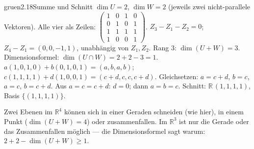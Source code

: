 \begin{loesungkarte}{gruen}{2.18}{Summe und Schnitt}
$\dim U = 2$, $\dim W = 2$ (jeweils zwei nicht-parallele Vektoren). Alle vier als Zeilen:
$\begin{pmatrix}1 & 0 & 1 & 0\\ 0 & 1 & 0 & 1\\ 1 & 1 & 1 & 1\\ 1 & 0 & 0 & 1\end{pmatrix}$. $Z_3 - Z_1 - Z_2 = 0$; $Z_4 - Z_1 = (0, 0, -1, 1)$, unabhängig von $Z_1, Z_2$. Rang $3$: $\dim(U + W) = 3$. Dimensionsformel: $\dim(U\cap W) = 2 + 2 - 3 = 1$.
$a(1, 0, 1, 0) + b(0, 1, 0, 1) = (a, b, a, b)$; $c(1, 1, 1, 1) + d(1, 0, 0, 1) = (c + d, c, c, c + d)$. Gleichsetzen: $a = c + d$, $b = c$, $a = c$, $b = c + d$. Aus $a = c = c + d$: $d = 0$; dann $a = b = c$. Schnitt: $\mathbb R\,(1, 1, 1, 1)$, Basis $\{(1, 1, 1, 1)\}$.
\begin{mitnehmen}\kastentext
Zwei Ebenen im $\mathbb R^{4}$ können sich in einer Geraden schneiden (wie hier), in einem Punkt ($\dim(U + W) = 4$) oder zusammenfallen. Im $\mathbb R^{3}$ ist nur die Gerade oder das Zusammenfallen möglich --- die Dimensionsformel sagt warum: $2 + 2 - \dim(U + W)\ge1$.
\end{mitnehmen}
\end{loesungkarte}

